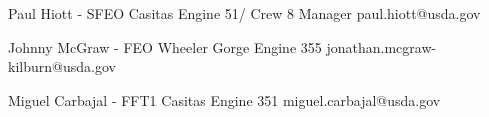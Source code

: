 
Paul Hiott - SFEO Casitas Engine 51/ Crew 8 Manager
paul.hiott@usda.gov

Johnny McGraw - FEO Wheeler Gorge Engine 355
jonathan.mcgraw-kilburn@usda.gov

Miguel Carbajal - FFT1 Casitas Engine 351
miguel.carbajal@usda.gov